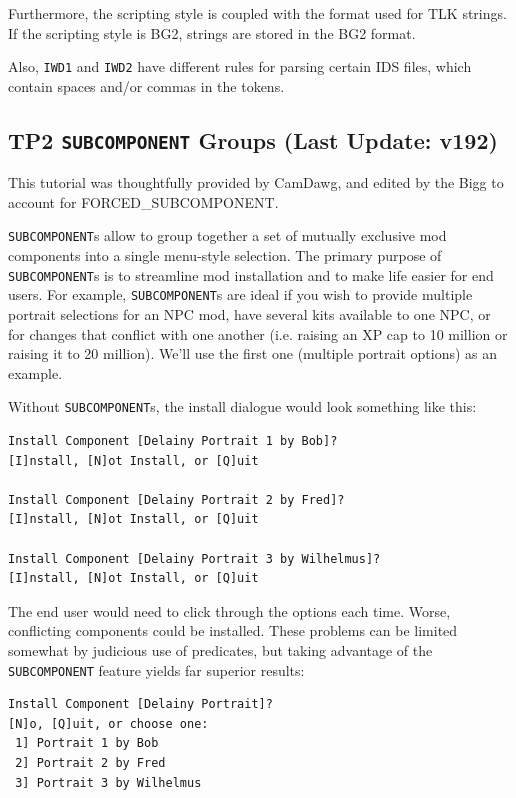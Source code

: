 \documentclass{article}
\def\t#1{{\tt #1}}
\begin{document}
Furthermore, the scripting style is coupled with the format used for TLK strings. If
the scripting style is BG2, strings are stored in the BG2 format.

Also, \t{IWD1} and \t{IWD2} have different rules for parsing certain IDS files,
which contain spaces and/or commas in the tokens.

\label{sec-subcomponent}\subsection{TP2 \t{SUBCOMPONENT} Groups (Last Update: v192)}

This tutorial was thoughtfully provided by CamDawg, and edited by the Bigg
to account for FORCED_SUBCOMPONENT.

\t{SUBCOMPONENT}s allow to group together a set of mutually exclusive mod
components into a single menu-style selection. The primary purpose of
\t{SUBCOMPONENT}s is to streamline mod installation and to make life easier for
end users. For example, \t{SUBCOMPONENT}s are ideal if you wish to provide
multiple portrait selections for an NPC mod, have several kits available to
one NPC, or for changes that conflict with one another (i.e. raising an XP
cap to 10 million or raising it to 20 million). We'll use the first
one (multiple portrait options) as an example.

Without \t{SUBCOMPONENT}s, the install dialogue would look something like this:

\begin{verbatim}
Install Component [Delainy Portrait 1 by Bob]?
[I]nstall, [N]ot Install, or [Q]uit

Install Component [Delainy Portrait 2 by Fred]?
[I]nstall, [N]ot Install, or [Q]uit

Install Component [Delainy Portrait 3 by Wilhelmus]?
[I]nstall, [N]ot Install, or [Q]uit
\end{verbatim}

The end user would need to click through the options each time. Worse,
conflicting components could be installed. These problems can be limited
somewhat by judicious use of predicates, but taking advantage of the
\t{SUBCOMPONENT} feature yields far superior results:

\begin{verbatim}
Install Component [Delainy Portrait]?
[N]o, [Q]uit, or choose one:
 1] Portrait 1 by Bob
 2] Portrait 2 by Fred
 3] Portrait 3 by Wilhelmus
\end{verbatim}
\end{document}
